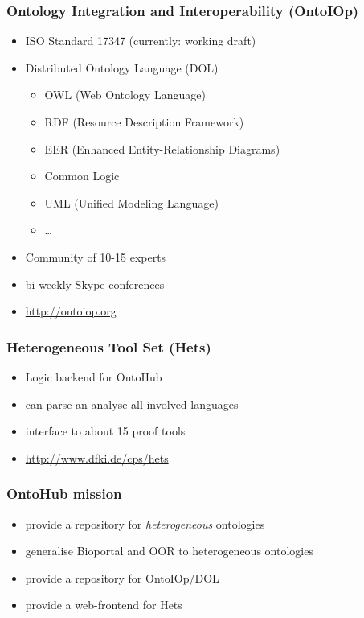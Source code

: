 \documentclass[german]{beamer}
\begin{document}
\begin{frame}
\frametitle{Ontology Integration and Interoperability (OntoIOp)}
\begin{itemize}
\item ISO Standard 17347 (currently: working draft)
\item Distributed Ontology Language (DOL)
\begin{itemize}
\item OWL (Web Ontology Language)
\item RDF (Resource Description Framework)
\item EER (Enhanced Entity-Relationship Diagrams)
\item Common Logic
\item UML (Unified Modeling Language)
\item \ldots
\end{itemize}
\item Community of 10-15 experts
\item bi-weekly Skype conferences
\item \url{http://ontoiop.org}
\end{itemize}
\end{frame}

\begin{frame}
\frametitle{Heterogeneous Tool Set (Hets)}
\begin{itemize}
\item Logic backend for OntoHub
\item can parse an analyse all involved languages
\item interface to about 15 proof tools
\item \url{http://www.dfki.de/cps/hets}
\end{itemize}
\end{frame}

\begin{frame}
\frametitle{OntoHub mission}
\begin{itemize}
\item provide a repository for \emph{heterogeneous} ontologies
\item generalise Bioportal and OOR to heterogeneous ontologies
\item provide a repository for OntoIOp/DOL
\item provide a web-frontend for Hets
\end{itemize}
\end{frame}
\end{document}
